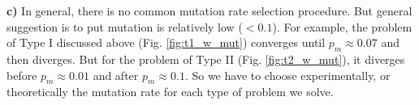 \documentclass[12pt, a4paper]{article}
\begin{document}
    {\bf c)} In general, there is no common mutation rate selection procedure.
    But general suggestion is to put mutation is relatively low ($<0.1$).
    For example, the problem of Type I discussed above (Fig. \ref{fig:t1_w_mut})
    converges until $p_m \approx 0.07$ and then diverges. But for the problem
    of Type II (Fig. \ref{fig:t2_w_mut}), it diverges before $p_m \approx 0.01$
    and after $p_m \approx 0.1$. So we have to choose experimentally,
    or theoretically the mutation rate for each type of problem we solve.
\end{document}
